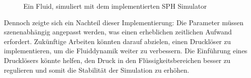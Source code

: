\documentclass[a4paper, 12pt]{article}
\begin{document}
\begin{figure}[H]
{	}
	\caption{Ein Fluid, simuliert mit dem implementierten SPH Simulator}
	\label{exampleSimulation}
\end{figure}

Dennoch zeigte sich ein Nachteil dieser Implementierung: Die Parameter müssen szenenabhängig angepasst werden, was einen erheblichen zeitlichen Aufwand erfordert. Zukünftige Arbeiten könnten darauf abzielen, einen Drucklöser zu implementieren, um die Fluiddynamik weiter zu verbessern. Die Einführung eines Drucklösers könnte helfen, den Druck in den Flüssigkeitsbereichen besser zu regulieren und somit die Stabilität der Simulation zu erhöhen.

\newpage
\nocite{*}
\printbibliography[title={Bibliographie}]
\end{document}
